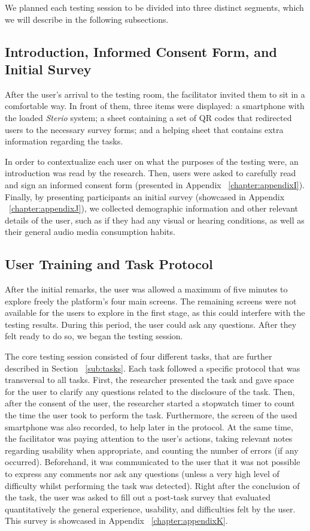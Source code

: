 We planned each testing session to be divided into three distinct segments, which we will describe in the following subsections.

\subsection{Introduction, Informed Consent Form, and Initial Survey}

After the user's arrival to the testing room, the facilitator invited them to sit in a comfortable way. In front of them, three items were displayed: a smartphone with the loaded \textit{Sterio} system; a sheet containing a set of QR codes that redirected users to the necessary survey forms; and a helping sheet that contains extra information regarding the tasks.

In order to contextualize each user on what the purposes of the testing were, an introduction was read by the research. Then, users were asked to carefully read and sign an informed consent form (presented in Appendix ~\ref{chapter:appendixI}). Finally, by presenting participants an initial survey (showcased in Appendix ~\ref{chapter:appendixJ}), we collected demographic information and other relevant details of the user, such as if they had any visual or hearing conditions, as well as their general audio media consumption habits.

\subsection{User Training and Task Protocol}
\label{subsub:taskprot}

After the initial remarks, the user was allowed a maximum of five minutes to explore freely the platform's four main screens. The remaining screens were not available for the users to explore in the first stage, as this could interfere with the testing results. During this period, the user could ask any questions. After they felt ready to do so, we began the testing session.

The core testing session consisted of four different tasks, that are further described in Section ~\ref{sub:tasks}. Each task followed a specific protocol that was transversal to all tasks. First, the researcher presented the task and gave space for the user to clarify any questions related to the disclosure of the task. Then, after the consent of the user, the researcher started a stopwatch timer to count the time the user took to perform the task. Furthermore, the screen of the used smartphone was also recorded, to help later in the protocol. At the same time, the facilitator was paying attention to the user's actions, taking relevant notes regarding usability when appropriate, and counting the number of errors (if any occurred). Beforehand, it was communicated to the user that it was not possible to express any comments nor ask any questions (unless a very high level of difficulty whilst performing the task was detected). Right after the conclusion of the task, the user was asked to fill out a post-task survey that evaluated quantitatively the general experience, usability, and difficulties felt by the user. This survey is showcased in Appendix ~\ref{chapter:appendixK}.

